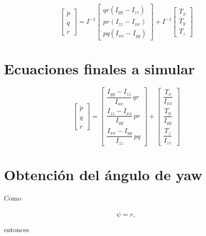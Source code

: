 \documentclass[11pt,a4paper]{article}
\begin{document}
\begin{equation*}
\begin{bmatrix} \dot p \\ \dot q \\ \dot r \end{bmatrix}
=
I^{-1}
\begin{bmatrix}
qr(I_{yy}-I_{zz}) \\
pr(I_{zz}-I_{xx}) \\
pq(I_{xx}-I_{yy})
\end{bmatrix}
+
I^{-1}
\begin{bmatrix} T_x \\ T_y \\ T_z \end{bmatrix}
\end{equation*}

\section{Ecuaciones finales a simular}

\begin{equation*}
\begin{bmatrix} \dot p \\ \dot q \\ \dot r \end{bmatrix}
=
\begin{bmatrix}
\dfrac{I_{yy}-I_{zz}}{I_{xx}}\,qr \\[8pt]
\dfrac{I_{zz}-I_{xx}}{I_{yy}}\,pr \\[8pt]
\dfrac{I_{xx}-I_{yy}}{I_{zz}}\,pq
\end{bmatrix}
+
\begin{bmatrix}
\dfrac{T_x}{I_{xx}} \\[8pt]
\dfrac{T_y}{I_{yy}} \\[8pt]
\dfrac{T_z}{I_{zz}}
\end{bmatrix}
\end{equation*}




\section*{Obtención del ángulo de yaw}

Como

\begin{equation}
\dot{\psi}=r,
\end{equation}

entonces
\end{document}
